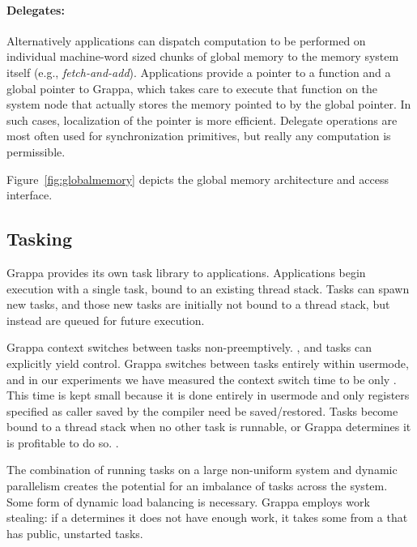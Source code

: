 \paragraph{Delegates:} Alternatively applications can dispatch computation to be performed on individual machine-word sized chunks of global memory to the memory system itself (e.g., \emph{fetch-and-add}).  Applications provide a pointer to a function and a global pointer to Grappa, which takes care to execute that function on the system node that actually stores the memory pointed to by the global pointer.  In such cases, localization of the pointer is more efficient.  Delegate operations are most often used for synchronization primitives, but really any computation is permissible.


Figure~\ref{fig:globalmemory} depicts the global memory architecture and access interface.

\subsection{Tasking}

Grappa provides its own task library to applications.  Applications begin execution with a single task, bound to an existing thread stack.  Tasks can spawn new tasks, and those new tasks are initially not bound to a thread stack, but instead are queued for future execution.

Grappa context switches between tasks non-preemptively. , and
tasks can explicitly yield control.  Grappa switches between tasks
entirely within usermode, and in our experiments we have measured the
context switch time to be only .  This time is kept
small because it is done entirely in usermode and only registers
specified as caller saved by the compiler need be saved/restored.
Tasks become bound to a thread stack when no other task is runnable,
or Grappa determines it is profitable to do so.  .

The combination of running tasks on a large non-uniform system and
dynamic parallelism creates the potential for an imbalance of tasks
across the system. Some form of dynamic load balancing is necessary.
Grappa employs work stealing: if a  determines it
does not have enough work, it takes some from a 
that has public, unstarted tasks.

